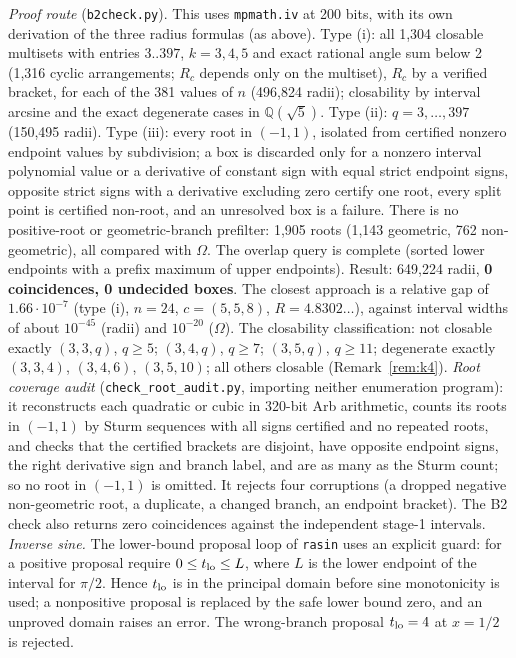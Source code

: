 \documentclass[11pt]{article}
\theoremstyle{definition}
\theoremstyle{remark}
\newcommand{\Q}{\mathbb{Q}}
\begin{document}
\noindent\emph{Proof route} (\texttt{b2check.py}).
This uses \texttt{mpmath.iv} at 200 bits, with its own derivation of the three radius formulas (as above). Type (i): all
1,304 closable multisets with entries $3..397$, $k=3,4,5$ and exact
rational angle sum below 2 (1,316 cyclic arrangements; $R_c$ depends only
on the multiset), $R_c$ by a verified bracket, for each of the 381 values
of $n$ (496,824 radii); closability by interval arcsine and the exact
degenerate cases in $\Q(\sqrt5)$. Type (ii): $q=3,\dots,397$ (150,495
radii). Type (iii): every root in $(-1,1)$, isolated from certified
nonzero endpoint values by subdivision; a box is discarded only for a
nonzero interval polynomial value or a derivative of constant sign with
equal strict endpoint signs, opposite strict signs with a derivative
excluding zero certify one root, every split point is certified non-root,
and an unresolved box is a failure. There is no positive-root or
geometric-branch prefilter: 1,905 roots (1,143 geometric, 762
non-geometric), all compared with $\Omega$. The overlap query is complete
(sorted lower endpoints with a prefix maximum of upper endpoints).
Result: 649,224 radii, \textbf{0 coincidences, 0 undecided boxes}. The
closest approach is a relative gap of $1.66\cdot10^{-7}$ (type (i), $n=24$,
$c=(5,5,8)$, $R=4.8302\ldots$), against interval widths of about
$10^{-45}$ (radii) and $10^{-20}$ ($\Omega$). The closability
classification: not closable exactly $(3,3,q)$, $q\ge5$; $(3,4,q)$,
$q\ge7$; $(3,5,q)$, $q\ge11$; degenerate exactly $(3,3,4)$, $(3,4,6)$,
$(3,5,10)$; all others closable (Remark~\ref{rem:k4}). \emph{Root
coverage audit} (\texttt{check\_root\_audit.py}, importing neither
enumeration program): it reconstructs each quadratic or
cubic in 320-bit Arb arithmetic, counts its roots in $(-1,1)$ by Sturm
sequences with all signs certified and no repeated roots, and checks that
the certified brackets are disjoint, have opposite endpoint signs, the
right derivative sign and branch label, and are as many as the Sturm
count; so no root in $(-1,1)$ is omitted. It rejects four corruptions (a
dropped negative non-geometric root, a duplicate, a changed branch, an
endpoint bracket). The B2 check also returns zero coincidences against the
independent stage-1 intervals. \emph{Inverse sine.} The lower-bound proposal loop of \texttt{rasin} uses an explicit guard: for a positive proposal require
$0\le t_{\rm lo}\le L$, where $L$ is the lower endpoint of the interval
for $\pi/2$. Hence $t_{\rm lo}$ is in the principal domain before sine
monotonicity is used; a nonpositive proposal is replaced by the safe lower
bound zero, and an unproved domain raises an error. The wrong-branch
proposal $t_{\rm lo}=4$ at $x=1/2$ is rejected.
\end{document}
